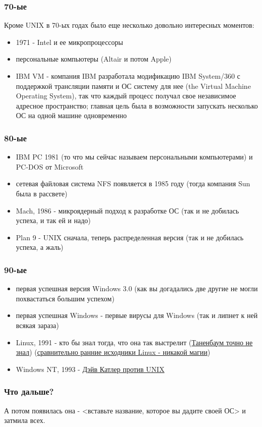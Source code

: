 \begin{frame}
\frametitle{70-ые}

Кроме UNIX в 70-ых годах было еще несколько довольно интересных моментов:

\begin{itemize}
  \item 1971 - Intel и ее микропроцессоры
  \item персональные компьютеры (Altair и потом Apple)
  \item IBM VM - компания IBM разработала модификацию IBM System/360 с
        поддержкой трансляции памяти и ОС систему для нее (the Virtual Machine
        Operating System), так что каждый процесс получал свое независимое
        адресное пространство; главная цель была в возможности запускать
        несколько ОС на одной машине одновременно
\end{itemize}
\end{frame}

\begin{frame}
\frametitle{80-ые}

\begin{itemize}
  \item IBM PC 1981 (то что мы сейчас называем персональными компьютерами) и
        PC-DOS от Microsoft
  \item сетевая файловая система NFS появляется в 1985 году (тогда компания Sun
        была в рассвете)
  \item Mach, 1986 - микроядерный подход к разработке ОС (так и не добилась
        успеха, и так ей и надо)
  \item Plan 9 - UNIX сначала, теперь распределенная версия (так и не добилась
        успеха, а жаль)
\end{itemize}
\end{frame}

\begin{frame}
\frametitle{90-ые}

\begin{itemize}
  \item первая успешная версия Windows 3.0 (как вы догадались две другие
        не могли похвастаться большим успехом)
  \item первая успешная Windows - первые вирусы для Windows (так и липнет к ней
        всякая зараза)
  \item Linux, 1991 - кто бы знал тогда, что она так выстрелит
        (\href{https://en.wikipedia.org/wiki/Tanenbaum\%E2\%80\%93Torvalds_debate}{Таненбаум точно не знал})
        (\href{https://www.kernel.org/pub/linux/kernel/Historic/v0.99/}{сравнительно ранние исходники Linux - никакой магии})
  \item Windows NT, 1993 - \href{https://en.wikipedia.org/wiki/Dave_Cutler\#Attitude_towards_Unix}{Дэйв Катлер против UNIX}
\end{itemize}
\end{frame}

\begin{frame}
\frametitle{Что дальше?}
А потом появилась она - <вставьте название, которое вы дадите своей ОС> и
затмила всех.
\end{frame}
